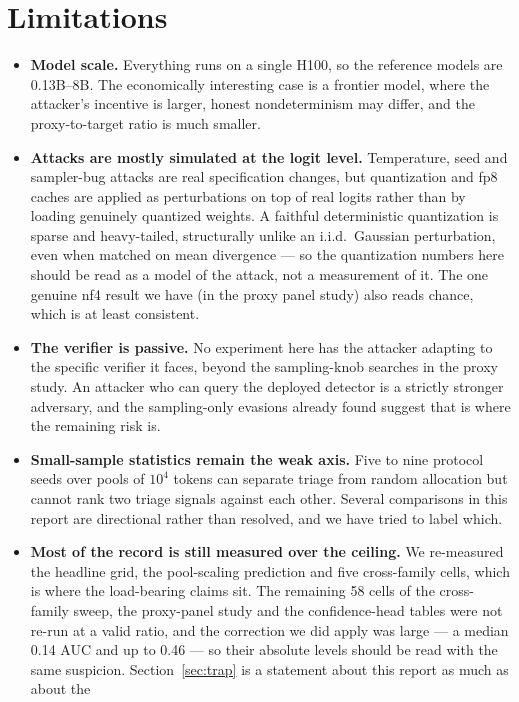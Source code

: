 \documentclass[11pt]{article}
\begin{document}
\section{Limitations}
\label{sec:limits}

\begin{itemize}
\item \textbf{Model scale.} Everything runs on a single H100, so the reference models
are 0.13B--8B. The economically interesting case is a frontier model, where the
attacker's incentive is larger, honest nondeterminism may differ, and the
proxy-to-target ratio is much smaller.
\item \textbf{Attacks are mostly simulated at the logit level.} Temperature, seed and
sampler-bug attacks are real specification changes, but quantization and fp8 caches
are applied as perturbations on top of real logits rather than by loading genuinely
quantized weights. A faithful deterministic quantization is sparse and heavy-tailed,
structurally unlike an i.i.d.\ Gaussian perturbation, even when matched on mean
divergence --- so the quantization numbers here should be read as a model of the
attack, not a measurement of it. The one genuine nf4 result we have (in the proxy
panel study) also reads chance, which is at least consistent.
\item \textbf{The verifier is passive.} No experiment here has the attacker adapting
to the specific verifier it faces, beyond the sampling-knob searches in the proxy
study. An attacker who can query the deployed detector is a strictly stronger
adversary, and the sampling-only evasions already found suggest that is where the
remaining risk is.
\item \textbf{Small-sample statistics remain the weak axis.} Five to nine protocol
seeds over pools of $10^4$ tokens can separate triage from random allocation but
cannot rank two triage signals against each other. Several comparisons in this report
are directional rather than resolved, and we have tried to label which.
\item \textbf{Most of the record is still measured over the ceiling.} We re-measured
the headline grid, the pool-scaling prediction and five cross-family cells, which is
where the load-bearing claims sit. The remaining 58 cells of the cross-family sweep,
the proxy-panel study and the confidence-head tables were not re-run at a valid
ratio, and the correction we did apply was large --- a median 0.14 AUC and up to
0.46 --- so their absolute levels should be read with the same suspicion.
Section~\ref{sec:trap} is a statement about this report as much as about the

\end{itemize}
\end{document}
